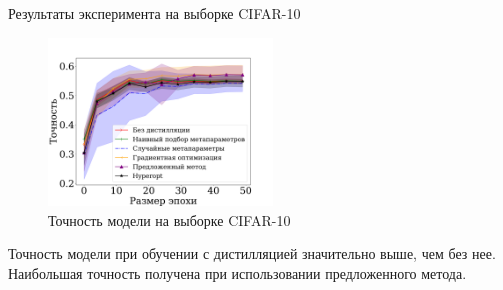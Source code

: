 \documentclass[12pt, aspectratio=169]{beamer}
\begin{document}

\begin{frame}{Результаты эксперимента на выборке CIFAR-10}
\begin{figure}
    \caption*{Точность модели на выборке CIFAR-10}
    \vspace{-1 cm}
    \includegraphics[width=0.53\textwidth]{mini_cifar_accuracy_rus.pdf}
\end{figure}
Точность модели при обучении с дистилляцией значительно выше, чем без нее. 
Наибольшая точность получена при использовании предложенного метода.
\end{frame}
\end{document}
